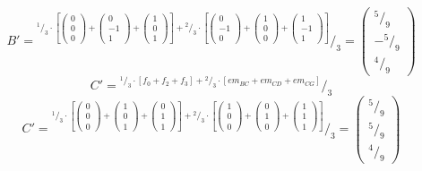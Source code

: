 \documentclass{article}
\newcommand*\rfrac[2]{{}^{#1}\!/_{#2}}%
\begin{document}
\[B'=\rfrac{\rfrac{1}{3}\cdot\left[
\left({\begin{array}{c} 0 \\  0 \\ 0 \end{array}}\right)+
\left({\begin{array}{c} 0 \\  -1 \\ 1 \end{array}}\right)+
\left({\begin{array}{c} 1 \\  0 \\ 1 \end{array}}\right)\right]+
\rfrac{2}{3}\cdot\left[
\left({\begin{array}{c} 0 \\  -1 \\ 0 \end{array}}\right)+
\left({\begin{array}{c} 1 \\  0 \\ 0 \end{array}}\right)+
\left({\begin{array}{c} 1 \\  -1 \\ 1 \end{array}}\right)\right]
}{3}=\left({\begin{array}{c} \rfrac{5}{9} \\  -\rfrac{5}{9} \\ \rfrac{4}{9} \end{array}}\right)\]
\[C'=\rfrac{\rfrac{1}{3}\cdot\left[f_0+f_2+f_3\right]+
\rfrac{2}{3}\cdot\left[em_{BC}+em_{CD}+em_{CG}\right]
}{3}\]
\[C'=\rfrac{\rfrac{1}{3}\cdot\left[
\left({\begin{array}{c} 0 \\  0 \\ 0 \end{array}}\right)+
\left({\begin{array}{c} 1 \\  0 \\ 1 \end{array}}\right)+
\left({\begin{array}{c} 0 \\  1 \\ 1 \end{array}}\right)\right]+
\rfrac{2}{3}\cdot\left[
\left({\begin{array}{c} 1 \\  0 \\ 0 \end{array}}\right)+
\left({\begin{array}{c} 0 \\  1 \\ 0 \end{array}}\right)+
\left({\begin{array}{c} 1 \\  1 \\ 1 \end{array}}\right)\right]
}{3}=\left({\begin{array}{c} \rfrac{5}{9} \\  \rfrac{5}{9} \\ \rfrac{4}{9} \end{array}}\right)\]
\end{document}
